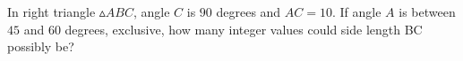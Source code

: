 In right triangle $\vartriangle ABC$, angle $C$ is $90$ degrees and $AC = 10$. If angle $A$ is between $45$ and $60$ degrees, exclusive, how many integer values could side length BC possibly be?
